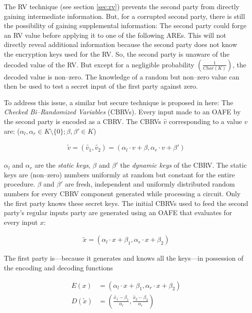 \label{sec:methods}

\label{sec:cbrv}

The RV technique (see section \ref{sec:rv}) prevents the
second party from directly gaining intermediate information. But, for a
corrupted second party, there is still the possibility of gaining supplemental
information: The second party could forge an RV value before applying it to one
of the following AREs. This will not directly reveal additional information
because the second party does not know the encryption keys used for the RV. So,
the second party is unaware of the decoded value of the RV. But except for a
negligible probability $\left(\frac{1}{Char(K)}\right)$, the decoded value is
non--zero.  The knowledge of a random but non--zero value can then be used to
test a secret input of the first party against zero. 

To address this issue, a similar but secure technique is proposed in here: The
\emph{Checked Bi--Randomized Variables} (CBRVs). Every input made to an OAFE by
the second party is encoded as a CBRV. The CBRVs $\hat{v}$ corresponding to a
value $v$ are: ($\alpha_l, \alpha_r \in K \setminus \{0\}; \beta, \beta' \in K$)

\begin{align*}
  \widetilde{v} = (\widetilde{v_1}, \widetilde{v_2}) =
  (\alpha_l \cdot v + \beta, \alpha_r \cdot v + \beta')
\end{align*}

\noindent{} $\alpha_l$ and $\alpha_r$ are the \emph{static keys}, $\beta$ and
$\beta'$ the \emph{dynamic keys} of the CBRV. The static keys are (non--zero)
numbers uniformly at random but constant for the entire procedure. $\beta$ and
$\beta'$ are fresh, independent and uniformly distributed random numbers for
every CBRV component generated while processing a circuit. Only the first party
knows these secret keys. The initial CBRVs used to feed the second party's
regular inputs party are generated using an OAFE that evaluates for every input
$x$:

\begin{align*}
  \widetilde{x} = (\alpha_l \cdot x + \beta_1, \alpha_r \cdot x + \beta_2)
\end{align*}

The first party is---because it generates and knows all the keys---in possession
of the encoding and decoding functions

\begin{align*}
  E(x) &= \left(\alpha_l \cdot x + \beta_1, \alpha_r \cdot x + \beta_2\right) \\
  D(\widetilde{x}) &= \left(\frac{\widetilde{x_1} - \beta_1}{\alpha_l},
                       \frac{\widetilde{x_2} - \beta_2}{\alpha_r}\right)
\end{align*}

